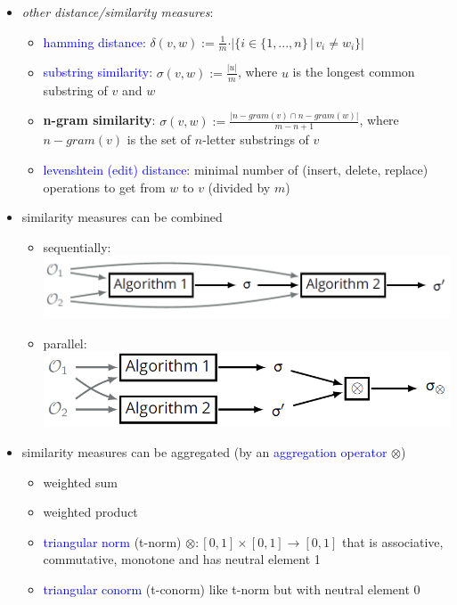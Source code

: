 \documentclass[12pt,a4paper]{article}
\newcommand{\blue}[1]{\textcolor{blue} {#1}}
\begin{document}
\begin{itemize}
\item \textit{other distance/similarity measures}:
\begin{itemize}
\item \blue{hamming distance}: $\displaystyle\delta(v,w) := \frac{1}{m}\cdot \vert \{i\in \{1,...,n\}\,|\, v_i \neq w_i\}\vert$
\item \blue{substring similarity}: $\displaystyle\sigma(v,w) := \frac{\vert u \vert}{m}$, where $u$ is the longest common substring of $v$ and $w$
\item \textbf{n-gram similarity}: $\displaystyle\sigma(v,w) := \frac{\vert n-gram(v) \cap n-gram(w)\vert}{m-n+1}$, where $n-gram(v)$ is the set of $n$-letter substrings of $v$
\item \blue{levenshtein (edit) distance}: minimal number of (insert, delete, replace) operations to get from $w$ to $v$ (divided by $m$)
\end{itemize}
\item similarity measures can be combined
\begin{itemize}
\item sequentially:\\
\includegraphics[scale=0.4]{./resources/sequential.png}
\item parallel:\\
\includegraphics[scale=0.4]{./resources/parallel.png}
\end{itemize}
\item similarity measures can be aggregated (by an \blue{aggregation operator} $\otimes$)
\begin{itemize}
\item weighted sum
\item weighted product
\item \blue{triangular norm} (t-norm) $\otimes: [0,1]\times[0,1]\rightarrow[0,1]$ that is associative, commutative, monotone and has neutral element 1
\item \blue{triangular conorm} (t-conorm) like t-norm but with neutral element 0
\end{itemize}


\end{itemize}
\end{document}

